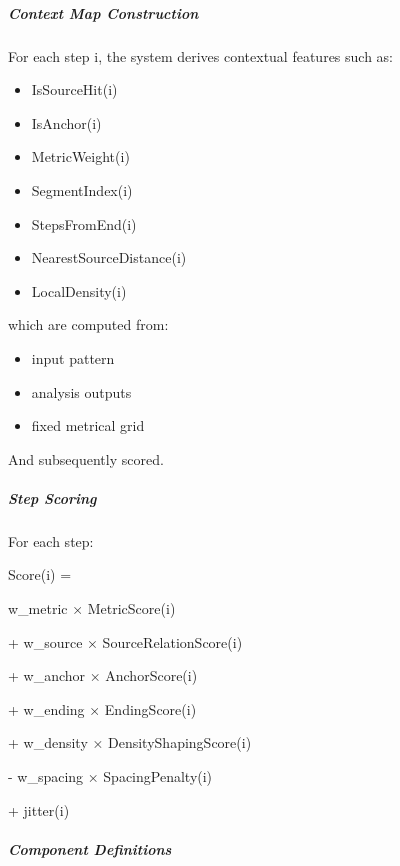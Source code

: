 \subparagraph{Context Map Construction}\label{context-map-construction}

For each step i, the system derives contextual features such as:

\begin{itemize}
\item
  IsSourceHit(i)
\item
  IsAnchor(i)
\item
  MetricWeight(i)
\item
  SegmentIndex(i)
\item
  StepsFromEnd(i)
\item
  NearestSourceDistance(i)
\item
  LocalDensity(i)
\end{itemize}

which are computed from:

\begin{itemize}
\item
  input pattern
\item
  analysis outputs
\item
  fixed metrical grid
\end{itemize}

And subsequently scored.

\subparagraph{Step Scoring}\label{step-scoring}

For each step:

Score(i) =

w\_metric × MetricScore(i)

+ w\_source × SourceRelationScore(i)

+ w\_anchor × AnchorScore(i)

+ w\_ending × EndingScore(i)

+ w\_density × DensityShapingScore(i)

- w\_spacing × SpacingPenalty(i)

+ jitter(i)

\subparagraph{Component Definitions}\label{component-definitions}

